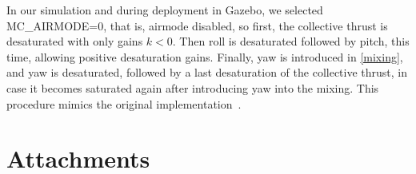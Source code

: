 In our simulation and during deployment in Gazebo, we selected MC\_AIRMODE=0, that is, airmode disabled, so first, the collective thrust is desaturated with only gains $k<0$.
Then roll is desaturated followed by pitch, this time, allowing positive desaturation gains.
Finally, yaw is introduced in \eqref{mixing}, and yaw is desaturated, followed by a last desaturation of the collective thrust, in case it becomes saturated again after introducing yaw into the mixing.
This procedure mimics the original implementation~\cite{px4_desat}.



\chapter{Attachments}
